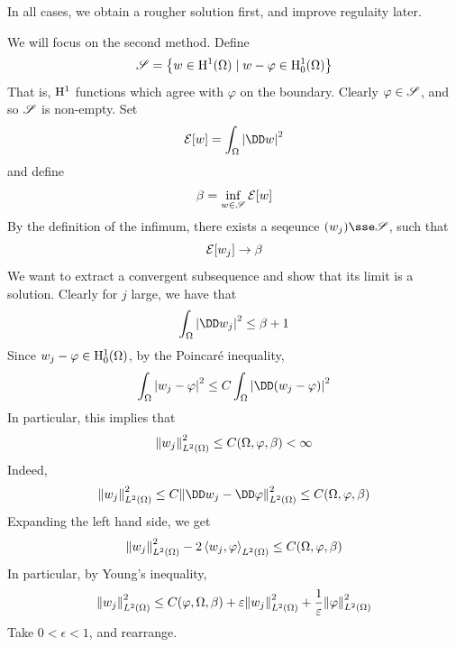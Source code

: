 \documentclass{article}
\begin{document}
\begin{remark}
    In all cases, we obtain a rougher solution first, and improve regulaity later.
\end{remark}

We will focus on the second method. Define
\[\mathscr{S} = \left\{w \in \mathrm{H}^1(\Omega) \mid w - \varphi \in \mathrm{H}_0^1(\Omega)\right\}\]
That is, \(\mathrm{H}^1\) functions which agree with \(\varphi\) on the boundary. Clearly \(\varphi \in \mathscr{S}\), and so \(\mathscr{S}\) is non-empty. Set
\[\mcE[w] = \int_\Omega \abs{\DD w}^2\]
and define
\[\beta = \inf_{w \in \mathscr{S}} \mathcal{E}[w]\]
By the definition of the infimum, there exists a seqeunce \((w_j) \sse \msS\), such that
\[\mathcal{E}[w_j] \to \beta\]
We want to extract a convergent subsequence and show that its limit is a solution. Clearly for \(j\) large, we have that
\[\int_\Omega \abs{\DD w_j}^2 \le \beta + 1\]
Since \(w_j - \varphi \in \mathrm{H}^1_0(\Omega)\), by the Poincar\'e inequality,
\[\int_\Omega\abs{w_j - \varphi}^2 \le C\int_\Omega \abs{\DD(w_j - \varphi)}^2\]
In particular, this implies that
\[\norm{w_j}_{L^2(\Omega)}^2 \le C(\Omega, \varphi, \beta) < \infty\]
Indeed,
\[\norm{w_j}_{L^2(\Omega)}^2 \le C\norm{\DD w_j - \DD \varphi}_{L^2(\Omega)}^2 \le C(\Omega, \varphi, \beta)\]
Expanding the left hand side, we get
\[\norm{w_j}_{L^2(\Omega)}^2 - 2 \left\langle w_j, \varphi \right\rangle_{L^2(\Omega)} \le C(\Omega, \varphi, \beta)\]
In particular, by Young's inequality,
\[\norm{w_j}_{L^2(\Omega)}^2 \le C(\varphi, \Omega, \beta) + \varepsilon\norm{w_j}_{L^2(\Omega)}^2 + \frac{1}{\varepsilon}\norm{\varphi}^2_{L^2(\Omega)}\]
Take \(0 < \epsilon < 1\), and rearrange.
\end{document}
